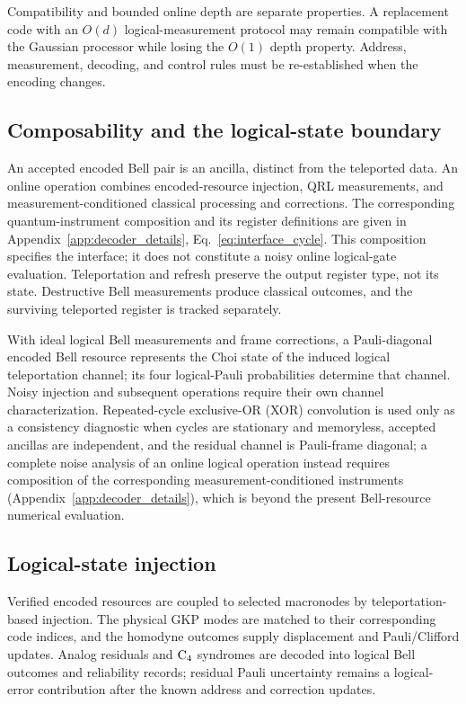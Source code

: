 \documentclass[aps,
prx,
superscriptaddress,
reprint,
longbibliography,
floatfix]{revtex4-2}
\begin{document}
Compatibility and bounded online depth are separate properties. A replacement code with an $O(d)$ logical-measurement protocol may remain compatible with the Gaussian processor while losing the $O(1)$ depth property. Address, measurement, decoding, and control rules must be re-established when the encoding changes.

\subsection{Composability and the logical-state boundary}\label{subsec:interface_composition}
An accepted encoded Bell pair is an ancilla, distinct from the teleported data. An online operation combines encoded-resource injection, QRL measurements, and measurement-conditioned classical processing and corrections. The corresponding quantum-instrument composition and its register definitions are given in Appendix~\ref{app:decoder_details}, Eq.~\eqref{eq:interface_cycle}. This composition specifies the interface; it does not constitute a noisy online logical-gate evaluation. Teleportation and refresh preserve the output register type, not its state. Destructive Bell measurements produce classical outcomes, and the surviving teleported register is tracked separately.

With ideal logical Bell measurements and frame corrections, a Pauli-diagonal encoded Bell resource represents the Choi state of the induced logical teleportation channel; its four logical-Pauli probabilities determine that channel. Noisy injection and subsequent operations require their own channel characterization. Repeated-cycle exclusive-OR (XOR) convolution is used only as a consistency diagnostic when cycles are stationary and memoryless, accepted ancillas are independent, and the residual channel is Pauli-frame diagonal; a complete noise analysis of an online logical operation instead requires composition of the corresponding measurement-conditioned instruments (Appendix~\ref{app:decoder_details}), which is beyond the present Bell-resource numerical evaluation.

\subsection{Logical-state injection}\label{subsec:interface_injection}
Verified encoded resources are coupled to selected macronodes by teleportation-based injection. The physical GKP modes are matched to their corresponding code indices, and the homodyne outcomes supply displacement and Pauli/Clifford updates. Analog residuals and ${\rm C_4}$ syndromes are decoded into logical Bell outcomes and reliability records; residual Pauli uncertainty remains a logical-error contribution after the known address and correction updates.
\end{document}
